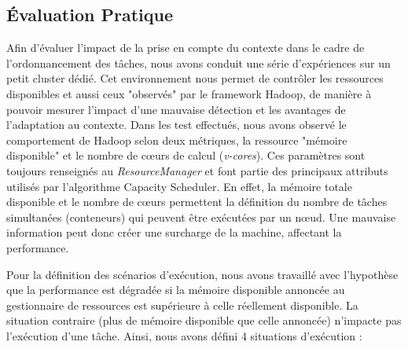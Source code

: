 \subsection{Évaluation Pratique} \label{sec:exper}

Afin d'évaluer l'impact de la prise en compte du contexte dans le cadre de l'ordonnancement des tâches, nous avons conduit une série d'expériences sur un petit cluster dédié. Cet environnement nous permet de contrôler les ressources disponibles et aussi ceux "observés" par le framework Hadoop, de manière à pouvoir mesurer l'impact d'une mauvaise détection et les avantages de l'adaptation au contexte. Dans les test effectués, nous avons observé le comportement de Hadoop selon deux métriques, la ressource "mémoire disponible" et le nombre de c{\oe}urs de calcul (\textit{v-cores}). Ces paramètres sont toujours renseignés au \textit{ResourceManager} et font partie des principaux attributs utilisés par l'algorithme Capacity Scheduler. En effet, la mémoire totale disponible et le nombre de c{\oe}urs permettent la définition du nombre de tâches simultanées (conteneurs) qui peuvent être exécutées par un n{\oe}ud. Une mauvaise information peut donc créer une surcharge de la machine, affectant la performance.  

Pour la définition des scénarios d'exécution, nous avons travaillé avec l'hypothèse que la performance est dégradée si la mémoire disponible annoncée au gestionnaire de ressources est supérieure à celle réellement disponible. La situation contraire (plus de mémoire disponible que celle annoncée) n'impacte pas l'exécution d'une tâche. Ainsi, nous avons défini 4 situations d'exécution :

